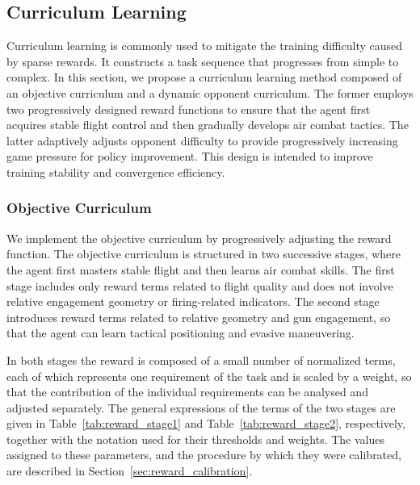 \documentclass[pdflatex,sn-mathphys-num]{sn-jnl}%
\theoremstyle{thmstyleone}%
\theoremstyle{thmstyletwo}%
\theoremstyle{thmstylethree}%
\begin{document}
\subsection{Curriculum Learning}

Curriculum learning is commonly used to mitigate the training difficulty caused by sparse rewards. It constructs a task sequence that progresses from simple to complex. In this section, we propose a curriculum learning method composed of an objective curriculum and a dynamic opponent curriculum. The former employs two progressively designed reward functions to ensure that the agent first acquires stable flight control and then gradually develops air combat tactics. The latter adaptively adjusts opponent difficulty to provide progressively increasing game pressure for policy improvement. This design is intended to improve training stability and convergence efficiency.

\subsubsection{Objective Curriculum}
\label{sec:reward_curriculum}

We implement the objective curriculum by progressively adjusting the reward function. The objective curriculum is structured in two successive stages, where the agent first masters stable flight and then learns air combat skills. The first stage includes only reward terms related to flight quality and does not involve relative engagement geometry or firing-related indicators. The second stage introduces reward terms related to relative geometry and gun engagement, so that the agent can learn tactical positioning and evasive maneuvering.

In both stages the reward is composed of a small number of normalized terms, each of which represents one requirement of the task and is scaled by a weight, so that the contribution of the individual requirements can be analysed and adjusted separately. The general expressions of the terms of the two stages are given in Table~\ref{tab:reward_stage1} and Table~\ref{tab:reward_stage2}, respectively, together with the notation used for their thresholds and weights. The values assigned to these parameters, and the procedure by which they were calibrated, are described in Section~\ref{sec:reward_calibration}.
\end{document}
